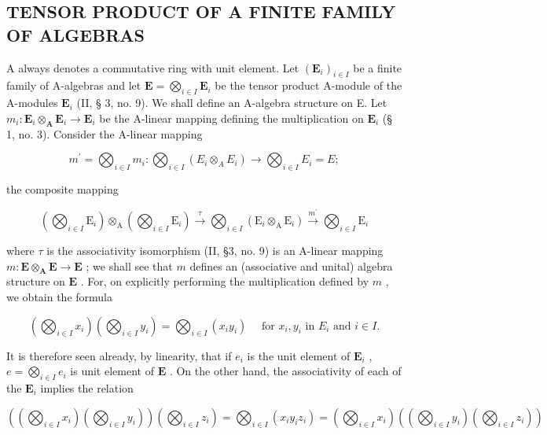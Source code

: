 \subsection{TENSOR PRODUCT OF A FINITE FAMILY OF ALGEBRAS}

A always denotes a commutative ring with unit element. Let \((\mathbf{E}_i)_{i\in I}\) be a finite family of A-algebras and let \(\mathbf{E} = \bigotimes_{i\in I}\mathbf{E}_i\) be the tensor product A-module of the A-modules \(\mathbf{E}_i\) (II, § 3, no. 9). We shall define an A-algebra structure on E. Let \(m_i\colon \mathbf{E}_i\otimes_\mathbf{A}\mathbf{E}_i\to \mathbf{E}_i\) be the A-linear mapping defining the multiplication on \(\mathbf{E}_i\) (§ 1, no. 3). Consider the A-linear mapping

\[
m ^ {\prime} = \bigotimes_ {i \in I} m _ {i}: \bigotimes_ {i \in I} (E _ {i} \otimes_ {A} E _ {i}) \rightarrow \bigotimes_ {i \in I} E _ {i} = E;
\]

the composite mapping

\[
\left(\bigotimes_ {i \in I} \mathrm{E} _ {i}\right) \otimes_ {\mathrm{A}} \left(\bigotimes_ {i \in I} \mathrm{E} _ {i}\right) \xrightarrow {\tau} \bigotimes_ {i \in I} \left(\mathrm{E} _ {i} \otimes_ {\mathrm{A}} \mathrm{E} _ {i}\right) \xrightarrow {m ^ {\prime}} \bigotimes_ {i \in I} \mathrm{E} _ {i}
\]

where \(\tau\) is the associativity isomorphism (II, §3, no. 9) is an A-linear mapping \(m\colon \mathbf{E} \otimes_{\mathbf{A}} \mathbf{E} \to \mathbf{E}\) ; we shall see that \(m\) defines an (associative and unital) algebra structure on \(\mathbf{E}\) . For, on explicitly performing the multiplication defined by \(m\) , we obtain the formula

\[
\left(\bigotimes_ {i \in I} x _ {i}\right) \left(\bigotimes_ {i \in I} y _ {i}\right) = \bigotimes_ {i \in I} \left(x _ {i} y _ {i}\right) \quad \text { for } x _ {i}, y _ {i} \text { in } E _ {i} \text { and } i \in I.\tag{1}
\]

It is therefore seen already, by linearity, that if \(e_i\) is the unit element of \(\mathbf{E}_i\) , \(e = \bigotimes_{i \in I} e_i\) is unit element of \(\mathbf{E}\) . On the other hand, the associativity of each of the \(\mathbf{E}_i\) implies the relation

\[
\left(\left(\bigotimes_ {i \in I} x _ {i}\right) \left(\bigotimes_ {i \in I} y _ {i}\right)\right) \left(\bigotimes_ {i \in I} z _ {i}\right) = \bigotimes_ {i \in I} \left(x _ {i} y _ {i} z _ {i}\right) = \left(\bigotimes_ {i \in I} x _ {i}\right) \left(\left(\bigotimes_ {i \in I} y _ {i}\right) \left(\bigotimes_ {i \in I} z _ {i}\right)\right)
\]

